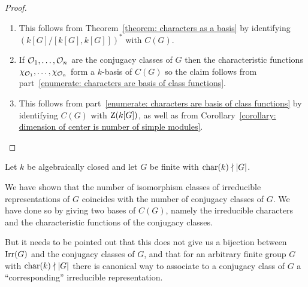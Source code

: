 \begin{proof}
  \leavevmode
  \begin{enumerate}
    \item
      This follows from Theorem~\ref{theorem: characters as a basis} by identifying $(k[G]/[k[G], k[G]])^*$ with $C(G)$.
    \item
      If $\mathcal{O}_1, \dotsc, \mathcal{O}_n$ are the conjugacy classes of $G$ then the characteristic functions $\chi_{\mathcal{O}_1}, \dotsc, \chi_{\mathcal{O}_n}$ form a $k$-basis of $C(G)$ so the claim follows from part~\ref*{enumerate: characters are basis of class functions}.
    \item
      This follows from part~\ref*{enumerate: characters are basis of class functions} by identifying $C(G)$ with $\operatorname{Z}(k[G])$, as well as from Corollary~\ref{corollary: dimension of center is number of simple modules}.
    \qedhere
  \end{enumerate}
\end{proof}


\begin{remark}
  \label{remark: bilinear form on characters is bilinear extension of hom}
  Let $k$ be algebraically closed and let $G$ be finite with $\operatorname{char}(k) \nmid |G|$.
  
  We have shown that the number of isomorphism classes of irreducible representations of $G$ coincides with the number of conjugacy classes of $G$.
  We have done so by giving two bases of $C(G)$, namely the irreducible characters and the characteristic functions of the conjugacy classes.
  
  But it needs to be pointed out that this does not give us a bijection between $\operatorname{Irr}(G)$ and the conjugacy classes of $G$, and that for an arbitrary finite group $G$ with $\operatorname{char}(k) \nmid |G|$ there is canonical way to associate to a conjugacy class of $G$ a \enquote{corresponding} irreducible representation.
\end{remark}


